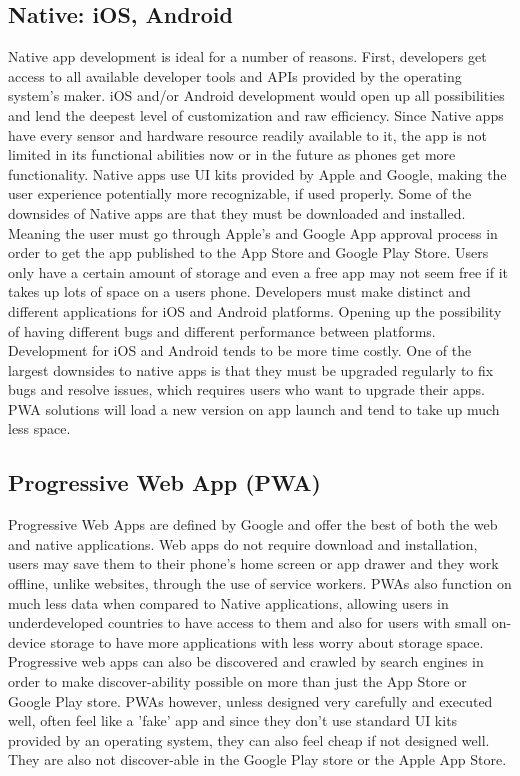 \documentclass[titlepage,onecolumn]{article}
\begin{document}
\subsection{Native: iOS, Android}
Native app development is ideal for a number of reasons. First, developers get access to all available developer tools and APIs provided by the operating system's maker. iOS and/or Android development would open up all possibilities and lend the deepest level of customization and raw efficiency. Since Native apps have every sensor and hardware resource readily available to it, the app is not limited in its functional abilities now or in the future as phones get more functionality. Native apps use UI kits provided by Apple and Google, making the user experience potentially more recognizable, if used properly. Some of the downsides of Native apps are that they must be downloaded and installed. Meaning the user must go through Apple's and Google App approval process in order to get the app published to the App Store and Google Play Store. Users only have a certain amount of storage and even a free app may not seem free if it takes up lots of space on a users phone. Developers must make distinct and different applications for iOS and Android platforms. Opening up the possibility of having different bugs and different performance between platforms. Development for iOS and Android tends to be more time costly. One of the largest downsides to native apps is that they must be upgraded regularly to fix bugs and resolve issues, which requires users who want to upgrade their apps. PWA solutions will load a new version on app launch and tend to take up much less space.

\subsection{Progressive Web App (PWA)}
Progressive Web Apps are defined by Google and offer the best of both the web and native applications. Web apps do not require download and installation, users may save them to their phone's home screen or app drawer and they work offline, unlike websites, through the use of service workers. PWAs also function on much less data when compared to Native applications, allowing users in underdeveloped countries to have access to them and also for users with small on-device storage to have more applications with less worry about storage space. Progressive web apps can also be discovered and crawled by search engines in order to make discover-ability possible on more than just the App Store or Google Play store. PWAs however, unless designed very carefully and executed well, often feel like a 'fake' app and since they don't use standard UI kits provided by an operating system, they can also feel cheap if not designed well. They are also not discover-able in the Google Play store or the Apple App Store.
\end{document}
